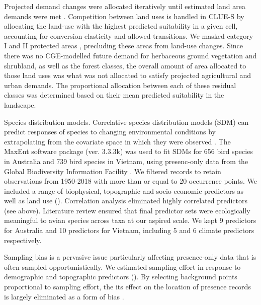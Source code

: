 \documentclass[titlesmallcaps,copyrightpage]{uomthesis}\usepackage[]{graphicx}\usepackage[]{color}
\begin{document}
Projected demand changes were allocated iteratively until estimated land area demands were met \citep{fuchs_high-resolution_2013}. Competition between land uses is handled in CLUE-S by allocating the land-use with the highest predicted suitability in a given cell, accounting for conversion elasticity and allowed transitions. We masked category I and II protected areas \citep{iucn_world_2014}, precluding these areas from land-use changes. Since there was no CGE-modelled future demand for herbaceous ground vegetation and shrubland, as well as the forest classes, the overall amount of area allocated to those land uses was what was not allocated to satisfy projected agricultural and urban demands. The proportional allocation between each of these residual classes was determined based on their mean predicted suitability in the landscape.

Species distribution models. Correlative species distribution models (SDM) can predict responses of species to changing environmental conditions by extrapolating from the covariate space in which they were observed \citep{lawson_prevalence_2014, wintle_fauna_2005, wintle_ecologicaleconomic_2011, thomas_climate_2004}. The MaxEnt software package \citep{phillips_internet_nodate} (ver. 3.3.3k) was used to fit SDMs for 656 bird species in Australia and 739 bird species in Vietnam, using presenc-only data from the Global Biodiversity Information Facility \citep{gbif_gbif_2016}. We filtered records to retain observations from 1950-2018 with more than or equal to 20 occurrence points. We included a range of biophysical, topographic and socio-economic predictors as well as land use (). Correlation analysis eliminated highly correlated predictors (see above). Literature review ensured that final predictor sets were ecologically meaningful to avian species across taxa \citep{gillings_directionality_2015, goetz_relative_2014, maggini_assessing_2014, coxen_species_2017} at our aspired scale. We kept 9 predictors for Australia and 10 predictors for Vietnam, including 5 and 6 climate predictors respectively. 

Sampling bias is a pervasive issue particularly affecting presence-only data that is often sampled opportunistically. We estimated sampling effort in response to demographic and topographic predictors \citep{stolar_accounting_2015} (). By selecting background points proportional to sampling effort, the its effect on the location of presence records is largely eliminated as a form of bias \citep{phillips_sample_2009}.
\end{document}
